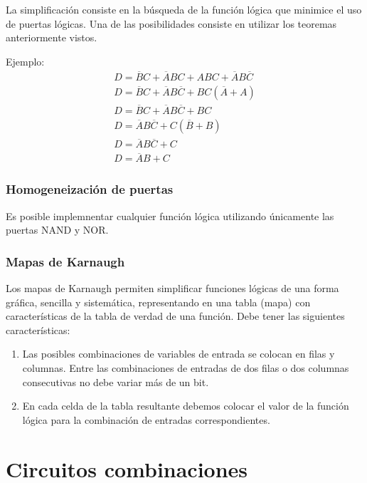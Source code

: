\documentclass[a4paper, 11pt, titlepage]{article}
\begin{document}
		La simplificación consiste en la búsqueda de la función lógica que minimice el uso 
		de puertas lógicas. Una de las posibilidades consiste en utilizar los teoremas anteriormente 
		vistos.

		Ejemplo:
		\begin{gather*} 
			D = \overline{B}C + \overline{A}BC + ABC + \overline{A}B\overline{C} \\ 
			D = \overline{B}C + \overline{A}B\overline{C} + BC(\overline{A} + A) \\
			D = \overline{B}C + \overline{A}B\overline{C} + BC \\
			D = \overline{A}B\overline{C} + C(\overline{B} + B) \\
			D = \overline{A}B\overline{C} + C \\
			D = \overline{A}B+ C
		\end{gather*}

		\subsubsection{Homogeneización de puertas}

			Es posible implemnentar cualquier función lógica utilizando únicamente las puertas 
			NAND y NOR.
    
		\subsubsection{Mapas de Karnaugh}

			Los mapas de Karnaugh permiten simplificar funciones lógicas de una forma gráfica, sencilla 
			y sistemática, representando en una tabla (mapa) con características de la tabla de verdad de 
			una función. Debe tener las siguientes características:

			\begin{enumerate}
				\item Las posibles combinaciones de variables de entrada se colocan en filas y columnas. 
				Entre las combinaciones de entradas de dos filas o dos columnas consecutivas no debe 
				variar más de un bit.
				\item En cada celda de la tabla resultante debemos colocar el valor de la función lógica 
				para la combinación de entradas correspondientes. 
			\end{enumerate}

\section{Circuitos combinaciones}
\end{document}
